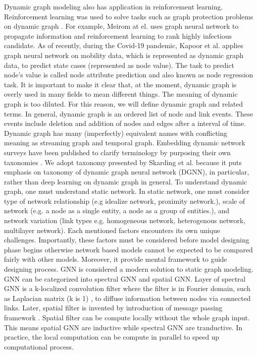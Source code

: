 \documentclass{IEEEtran}
\begin{document}
Dynamic graph modeling also has application in reinforcement learning. Reinforcement learning was used to solve tasks such as graph protection problems on dynamic graph \cite{wijayanto2018learning,wijayanto2019effective}. For example, Meirom at el. \cite{meirom2021controlling} uses graph neural network to propagate information and reinforcement learning to rank highly infectious candidate. As of recently, during the Covid-19 pandemic, Kapoor et al. \cite{kapoor2020examining}  applies graph neural network on mobility data, which is represented as dynamic graph data, to predict state cases (represented as node value). The task to predict node's value is called node attribute prediction and also known as node regression task.
It is important to make it clear that, at the moment, dynamic graph is overly used in many fields to mean different things. The meaning of dynamic graph is too diluted. For this reason, we will define dynamic graph and related terms. In general, dynamic graph is an ordered list of node and link events. These events include deletion and addition of nodes and edges after a interval of time. Dynamic graph has many (imperfectly) equivalent names with conflicting meaning as streaming graph and temporal graph. Embedding dynamic network surveys have been published to clarify terminology by purposing their own taxonomies \cite{barrosSurveyEmbeddingDynamic2021,kazemiRepresentationLearningDynamica,skardingFoundationsModelingDynamic2021}. We adopt taxonomy presented by Skarding et al. \cite{skardingFoundationsModelingDynamic2021} because it puts emphasis on taxonomy of dynamic graph neural network (DGNN), in particular, rather than deep learning on dynamic graph in general.
To understand dynamic graph, one must understand static network. In static network, one must consider type of network relationship (e.g idealize network, proximity network.), scale of network (e.g. a node as a single entity, a node as a group of entities.), and network variation (link types e.g. homogeneous network, heterogenous network, multilayer network). Each mentioned factors encounters its own unique challenges. Importantly, these factors must be considered before model designing phase begins otherwise network based models cannot be expected to be compared fairly with other models. Moreover, it provide mental framework to guide designing process. GNN is considered a modern solution to static graph modeling. GNN can be categorized into spectral GNN and spatial GNN. Layer of spectral GNN is a k-localized convolution filter where the filter is in Fourier domain, such as Laplacian matrix (k is 1) \cite{kipf2016semi}, to diffuse information between nodes via connected links. Later, spatial filter is invented by introduction of message passing framework \cite{gilmer2017neural}. Spatial filter can be compute locally without the whole graph input. This means spatial GNN are inductive while spectral GNN are tranductive. In practice, the local computation can be compute in parallel to speed up computational process.
\end{document}
